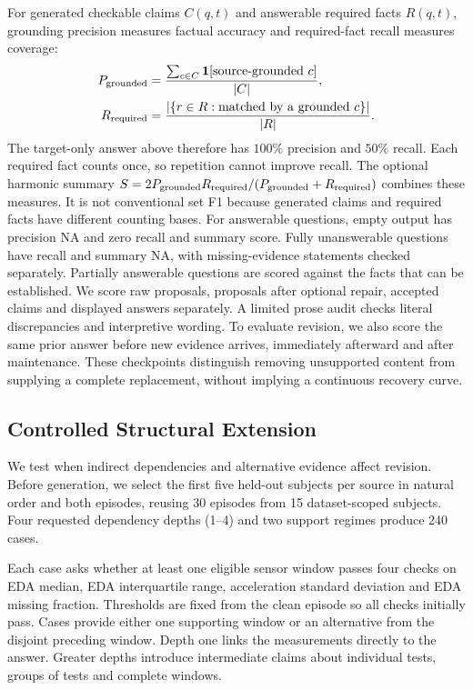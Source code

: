 \documentclass[runningheads]{llncs}
\begin{document}
For generated checkable claims $C(q,t)$ and answerable required facts $R(q,t)$,
grounding precision measures factual accuracy and required-fact recall measures
coverage:
\begin{equation}
\begin{aligned}
 P_{\rm grounded}&=\frac{\sum_{c\in C}\mathbf 1[\text{source-grounded }c]}{|C|},\\
 R_{\rm required}&=\frac{|\{r\in R:\text{matched by a grounded }c\}|}{|R|}.
\end{aligned}
 \label{eq:semanticmetrics}
\end{equation}
The target-only answer above therefore has $100\%$ precision and $50\%$ recall.
Each required fact counts once, so repetition cannot improve recall.
The optional harmonic summary
$S=2P_{\rm grounded}R_{\rm required}/(P_{\rm grounded}+R_{\rm required})$
combines these measures. It is not conventional set F1 because generated
claims and required facts have different counting bases.
For answerable questions, empty output has precision NA and zero recall and
summary score. Fully unanswerable questions have recall and summary NA, with
missing-evidence statements checked separately. Partially answerable questions
are scored against the facts that can be established.
We score raw proposals, proposals after optional repair, accepted claims and
displayed answers separately. A limited prose audit checks literal discrepancies
and interpretive wording. To evaluate revision, we also score the same prior
answer before new evidence arrives, immediately afterward and after maintenance.
These checkpoints distinguish removing unsupported content from supplying a
complete replacement, without implying a continuous recovery curve.




\subsection{Controlled Structural Extension}

We test when indirect dependencies and alternative evidence affect revision.
Before generation, we select the first five held-out subjects per source in
natural order and both episodes, reusing 30 episodes from 15 dataset-scoped subjects.
Four requested dependency depths (1--4) and two support regimes produce
240 cases.

Each case asks whether at least one eligible sensor window passes four checks
on EDA median, EDA interquartile range, acceleration standard deviation and
EDA missing fraction. Thresholds are fixed from the clean episode so all
checks initially pass. Cases provide either one supporting window or an
alternative from the disjoint preceding window. Depth one links the measurements
directly to the answer. Greater depths introduce intermediate claims about
individual tests, groups of tests and complete windows.
\end{document}
